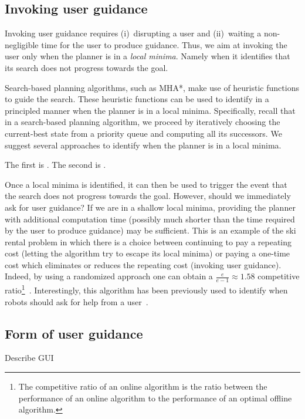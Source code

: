 \documentclass[conference]{IEEEtran}
\begin{document}

\subsection{Invoking user guidance}
\label{sec:q1}
Invoking user guidance requires (i)~disrupting a user and (ii)~waiting a non-negligible time for the user to produce guidance.
Thus, we aim at invoking the user only when the planner is in a \emph{local minima}. Namely when it identifies that its search does not progress towards the goal. 

Search-based planning algorithms, such as MHA*, make use of heuristic functions to guide the search. These heuristic functions can be used to identify in a principled manner when the planner is in a local minima. 
Specifically, recall that in a search-based planning algorithm,  we proceed by iteratively choosing  the current-best state from a priority queue and computing all its successors. We suggest several approaches to identify when the planner is in a local minima.

The first is .
The second is .

Once a local minima is identified, it can then be used to trigger the event that the search does not progress towards the goal. 
However, should we immediately ask for user guidance? If we are in a shallow local minima, providing the planner with additional computation time (possibly much shorter than the time required by the user to produce guidance) may be sufficient.
This is an example of the ski rental problem in which there is a choice between continuing to pay a repeating cost (letting the algorithm try to escape its local minima) or paying a one-time cost which eliminates or reduces the repeating cost (invoking user guidance).
Indeed, by using a randomized approach one can obtain a $\frac{e}{e-1}\approx1.58$ competitive ratio\footnote{The competitive ratio of an online algorithm is the ratio between the performance of an online algorithm to the performance of an optimal offline algorithm.}~\cite{KMMO94}.
Interestingly, this algorithm has been previously used to identify when robots should ask for help from a user~\cite{RV12}.

\subsection{Form of user guidance}
Describe GUI
\end{document}
